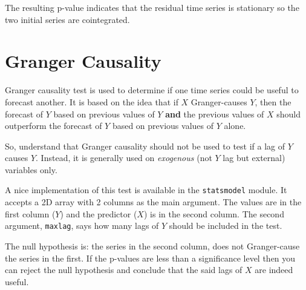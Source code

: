 The resulting p-value indicates that the residual time series is
stationary so the two initial series are cointegrated.

\section{Granger Causality}\label{granger-causality}

Granger causality test is used to determine if one time series could be
useful to forecast another. It is based on the idea that if \(X\)
Granger-causes \(Y\), then the forecast of \(Y\) based on previous
values of \(Y\) \textbf{and} the previous values of \(X\) should 
outperform the
forecast of \(Y\) based on previous values of \(Y\) alone.

So, understand that Granger causality should not be used to test if a
lag of \(Y\) causes \(Y\). Instead, it is generally used on \emph{exogenous}
(not \(Y\) lag but external) variables only.

A nice implementation of this test is available in the
\texttt{statsmodel} module. It accepts a 2D array with 2 columns as the
main argument. The values are in the first column ($Y$) and the predictor
($X$) is in the second column. The second argument, \texttt{maxlag},
says how many lags of \(Y\) should be included in the test.

The null hypothesis is: the series in the second column, does not
Granger-cause the series in the first. If the p-values are less than a
significance level then you can reject the null hypothesis and conclude
that the said lags of \(X\) are indeed useful.

